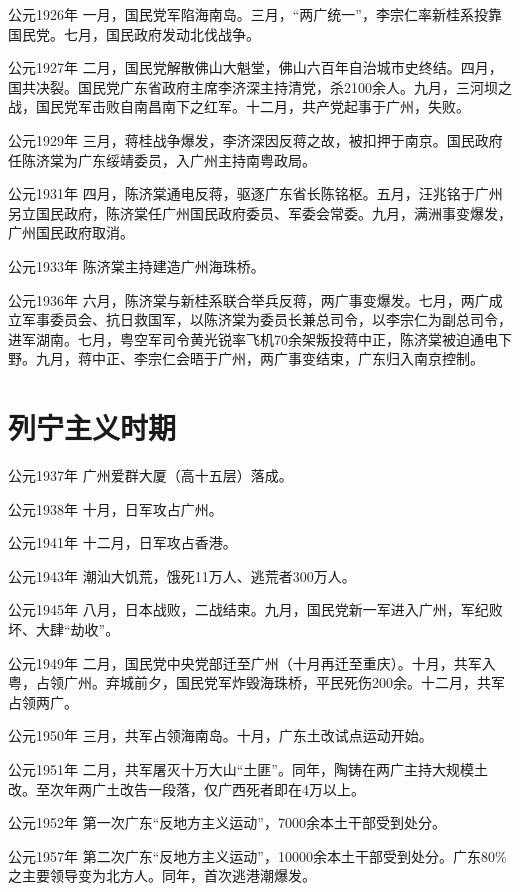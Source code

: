 公元1926年 一月，国民党军陷海南岛。三月，“两广统一”，李宗仁率新桂系投靠国民党。七月，国民政府发动北伐战争。

公元1927年 二月，国民党解散佛山大魁堂，佛山六百年自治城市史终结。四月，国共决裂。国民党广东省政府主席李济深主持清党，杀2100余人。九月，三河坝之战，国民党军击败自南昌南下之红军。十二月，共产党起事于广州，失败。

公元1929年 三月，蒋桂战争爆发，李济深因反蒋之故，被扣押于南京。国民政府任陈济棠为广东绥靖委员，入广州主持南粤政局。

公元1931年 四月，陈济棠通电反蒋，驱逐广东省长陈铭枢。五月，汪兆铭于广州另立国民政府，陈济棠任广州国民政府委员、军委会常委。九月，满洲事变爆发，广州国民政府取消。

公元1933年 陈济棠主持建造广州海珠桥。

公元1936年 六月，陈济棠与新桂系联合举兵反蒋，两广事变爆发。七月，两广成立军事委员会、抗日救国军，以陈济棠为委员长兼总司令，以李宗仁为副总司令，进军湖南。七月，粤空军司令黄光锐率飞机70余架叛投蒋中正，陈济棠被迫通电下野。九月，蒋中正、李宗仁会晤于广州，两广事变结束，广东归入南京控制。



\section*{列宁主义时期}

公元1937年 广州爱群大厦（高十五层）落成。

公元1938年 十月，日军攻占广州。

公元1941年 十二月，日军攻占香港。

公元1943年 潮汕大饥荒，饿死11万人、逃荒者300万人。

公元1945年 八月，日本战败，二战结束。九月，国民党新一军进入广州，军纪败坏、大肆“劫收”。

公元1949年 二月，国民党中央党部迁至广州（十月再迁至重庆）。十月，共军入粤，占领广州。弃城前夕，国民党军炸毁海珠桥，平民死伤200余。十二月，共军占领两广。

公元1950年 三月，共军占领海南岛。十月，广东土改试点运动开始。

公元1951年 二月，共军屠灭十万大山“土匪”。同年，陶铸在两广主持大规模土改。至次年两广土改告一段落，仅广西死者即在4万以上。

公元1952年 第一次广东“反地方主义运动”，7000余本土干部受到处分。

公元1957年 第二次广东“反地方主义运动”，10000余本土干部受到处分。广东80\%之主要领导变为北方人。同年，首次逃港潮爆发。

